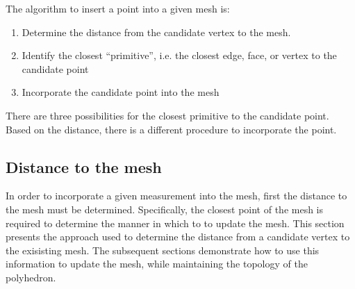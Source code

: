 The algorithm to insert a point into a given mesh is:

\begin{enumerate}
    \item Determine the distance from the candidate vertex to the mesh.
    \item Identify the closest ``primitive'', i.e. the closest edge, face, or vertex to the candidate point
    \item Incorporate the candidate point into the mesh
\end{enumerate}

There are three possibilities for the closest primitive to the candidate point. 
Based on the distance, there is a different procedure to incorporate the point.

\subsection{Distance to the mesh}

In order to incorporate a given measurement into the mesh, first the distance to the mesh must be determined.
Specifically, the closest point of the mesh is required to determine the manner in which to to update the mesh.
This section presents the approach used to determine the distance from a candidate vertex to the exisisting mesh. 
The subsequent sections demonstrate how to use this information to update the mesh, while maintaining the topology of the polyhedron.

